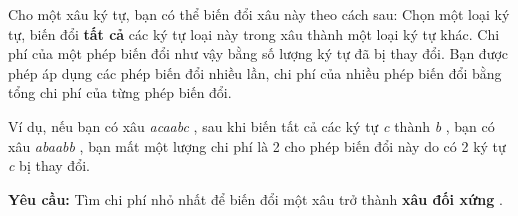 Cho một xâu ký tự, bạn có thể biến đổi xâu này theo cách sau: Chọn một loại ký tự, biến đổi \textbf{ tất cả } các ký tự loại này trong xâu thành một loại ký tự khác. Chi phí của một phép biến đổi như vậy bằng số lượng ký tự đã bị thay đổi. Bạn được phép áp dụng các phép biến đổi nhiều lần, chi phí của nhiều phép biến đổi bằng tổng chi phí của từng phép biến đổi.

Ví dụ, nếu bạn có xâu \emph{ acaabc } , sau khi biến tất cả các ký tự \emph{ c } thành \emph{ b } , bạn có xâu \emph{ abaabb } , bạn mất một lượng chi phí là 2 cho phép biến đổi này do có 2 ký tự \emph{ c } bị thay đổi.

\textbf{Yêu cầu: } Tìm chi phí nhỏ nhất để biến đổi một xâu trở thành \textbf{ xâu đối xứng } .